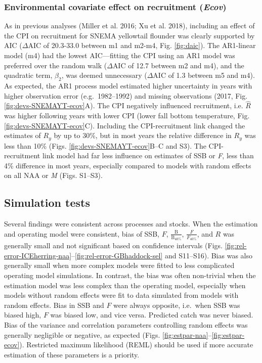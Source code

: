 \documentclass[]{article}
\begin{document}
\hypertarget{environmental-covariate-effect-on-recruitment-ecov}{%
\subsubsection{\texorpdfstring{Environmental covariate effect on
recruitment
(\emph{Ecov})}{Environmental covariate effect on recruitment (Ecov)}}\label{environmental-covariate-effect-on-recruitment-ecov}}

As in previous analyses (Miller et al. 2016; Xu et al. 2018), including
an effect of the CPI on recruitment for SNEMA yellowtail flounder was
clearly supported by AIC (\(\Delta \text{AIC}\) of 20.3-33.0 between m1
and m2-m4, Fig. \ref{fig:daic}). The AR1-linear model (m4) had the
lowest AIC---fitting the CPI using an AR1 model was preferred over the
random walk (\(\Delta \text{AIC}\) of 12.7 between m2 and m4), and the
quadratic term, \(\beta_2\), was deemed unnecessary
(\(\Delta \text{AIC}\) of 1.3 between m5 and m4). As expected, the AR1
process model estimated higher uncertainty in years with higher
observation error (e.g.~1982--1992) and missing observations (2017, Fig.
\ref{fig:devs-SNEMAYT-ecov}A). The CPI negatively influenced
recruitment, i.e. \(\hat{R}\) was higher following years with lower CPI
(lower fall bottom temperature, Fig. \ref{fig:devs-SNEMAYT-ecov}C).
Including the CPI-recruitment link changed the estimates of \(R_y\) by
up to 30\%, but in most years the relative difference in \(R_y\) was
less than 10\% (Figs. \ref{fig:devs-SNEMAYT-ecov}B--C and S3). The
CPI-recruitment link model had far less influence on estimates of SSB or
\emph{F}, less than 4\% difference in most years, especially compared to
models with random effects on all NAA or \emph{M} (Figs. S1--S3).

\hypertarget{simulation-tests-1}{%
\subsection{Simulation tests}\label{simulation-tests-1}}

Several findings were consistent across processes and stocks. When the
estimation and operating model were consistent, bias of SSB, \(F\),
\(\frac{\text{B}}{\text{B}_{40\%}}\), \(\frac{F}{F_{40\%}}\), and \(R\)
was generally small and not significant based on confidence intervals
(Figs.
\ref{fig:rel-error-ICEherring-naa}--\ref{fig:rel-error-GBhaddock-sel}
and S11--S16). Bias was also generally small when more complex models
were fitted to less complicated operating model simulations. In
contrast, the bias was often non-trivial when the estimation model was
less complex than the operating model, especially when models without
random effects were fit to data simulated from models with random
effects. Bias in SSB and \(F\) were always opposite, i.e.~when SSB was
biased high, \(F\) was biased low, and vice versa. Predicted catch was
never biased. Bias of the variance and correlation parameters
controlling random effects was generally negligible or negative, as
expected (Figs. \ref{fig:estpar-naa}--\ref{fig:estpar-ecov}). Restricted
maximum likelihood (REML) should be used if more accurate estimation of
these parameters is a priority.
\end{document}
